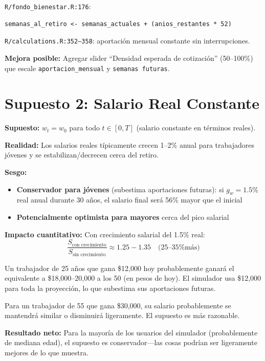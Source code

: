 \documentclass[11pt,a4paper]{report}
\begin{document}
\begin{tcolorbox}[colback=orange!5!white, colframe=orange!75!black, title=\textbf{Aplicaci\'on en C\'odigo}]
\texttt{R/fondo\_bienestar.R:176}:
\begin{lstlisting}
semanas_al_retiro <- semanas_actuales + (anios_restantes * 52)
\end{lstlisting}
\texttt{R/calculations.R:352--358}: aportaci\'on mensual constante sin interrupciones.

\textbf{Mejora posible:} Agregar slider ``Densidad esperada de cotizaci\'on'' (50--100\%) que escale \texttt{aportacion\_mensual} y \texttt{semanas futuras}.
\end{tcolorbox}


\section{Supuesto 2: Salario Real Constante}

\begin{tcolorbox}[colback=blue!5!white, colframe=blue!75!black, title=\textbf{Definici\'on Formal}]
\textbf{Supuesto:} $w_t = w_0$ para todo $t \in [0, T]$ (salario constante en t\'erminos reales).

\textbf{Realidad:} Los salarios reales t\'ipicamente crecen 1--2\% anual para trabajadores j\'ovenes y se estabilizan/decrecen cerca del retiro.

\textbf{Sesgo:}
\begin{itemize}
  \item \textbf{Conservador para j\'ovenes} (subestima aportaciones futuras): si $g_w = 1.5\%$ real anual durante 30 a\~nos, el salario final ser\'a 56\% mayor que el inicial
  \item \textbf{Potencialmente optimista para mayores} cerca del pico salarial
\end{itemize}

\textbf{Impacto cuantitativo:} Con crecimiento salarial del 1.5\% real:
\[
  \frac{S_{\text{con crecimiento}}}{S_{\text{sin crecimiento}}} \approx 1.25 - 1.35 \quad \text{(25--35\% m\'as)}
\]
\end{tcolorbox}

\begin{tcolorbox}[colback=green!5!white, colframe=green!50!black, title=\textbf{Intuici\'on}]
Un trabajador de 25 a\~nos que gana \$12,000 hoy probablemente ganar\'a el equivalente a \$18,000--20,000 a los 50 (en pesos de hoy). El simulador usa \$12,000 para toda la proyecci\'on, lo que subestima sus aportaciones futuras.

Para un trabajador de 55 que gana \$30,000, su salario probablemente se mantendr\'a similar o disminuir\'a ligeramente. El supuesto es m\'as razonable.

\textbf{Resultado neto:} Para la mayor\'ia de los usuarios del simulador (probablemente de mediana edad), el supuesto es conservador---las cosas podr\'ian ser ligeramente mejores de lo que muestra.
\end{tcolorbox}
\end{document}
